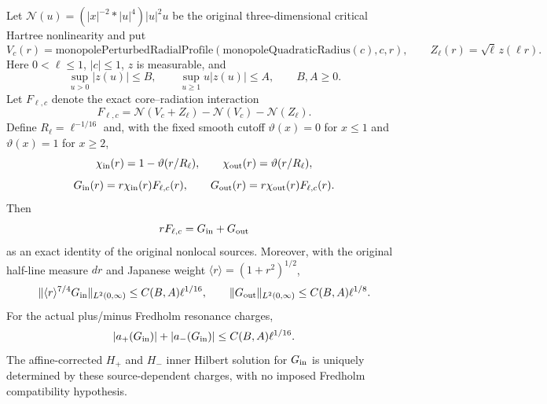%

\begin{lemma}
\label{lem:hbl-physical-two-weight-source}
Let $\mathcal{N}(u)=(|x|^{-2}*|u|^4)|u|^2u$ be the original
three-dimensional critical Hartree nonlinearity and put
\[
  V_c(r)=\mathrm{monopolePerturbedRadialProfile}
       (\mathrm{monopoleQuadraticRadius}(c),c,r),
  \qquad Z_\ell(r)=\sqrt{\ell}\,z(\ell r).
\]
Here $0<\ell\le1$, $|c|\le1$, $z$ is measurable, and
\[
 \sup_{u>0}|z(u)|\le B,\qquad
 \sup_{u\ge1}u|z(u)|\le A,\qquad B,A\ge0.
\]
Let $F_{\ell,c}$ denote the exact core--radiation interaction
\[
 F_{\ell,c}=\mathcal{N}(V_c+Z_\ell)
          -\mathcal{N}(V_c)-\mathcal{N}(Z_\ell).
\]
Define $R_\ell=\ell^{-1/16}$ and, with the fixed smooth cutoff
$\vartheta(x)=0$ for $x\le1$ and $\vartheta(x)=1$ for $x\ge2$,
\[
 \chi_{\rm in}(r)=1-\vartheta(r/R_\ell),\qquad
 \chi_{\rm out}(r)=\vartheta(r/R_\ell),
\]
\[
 G_{\rm in}(r)=r\chi_{\rm in}(r)F_{\ell,c}(r),\qquad
 G_{\rm out}(r)=r\chi_{\rm out}(r)F_{\ell,c}(r).
\]
Then
\[
             rF_{\ell,c}=G_{\rm in}+G_{\rm out}
\]
as an exact identity of the original nonlocal sources. Moreover,
with the original half-line measure $dr$ and Japanese weight
$\langle r\rangle=(1+r^2)^{1/2}$,
\[
 \|\langle r\rangle^{7/4}G_{\rm in}\|_{L^2(0,\infty)}
 \le C(B,A)\ell^{1/16},
 \qquad
 \|G_{\rm out}\|_{L^2(0,\infty)}
 \le C(B,A)\ell^{1/8}.
\]
For the actual plus/minus Fredholm resonance charges,
\[
 |a_+(G_{\rm in})|+|a_-(G_{\rm in})|
 \le C(B,A)\ell^{1/16}.
\]
The affine-corrected $H_+$ and $H_-$ inner Hilbert solution for
$G_{\rm in}$ is uniquely determined by these source-dependent
charges, with no imposed Fredholm compatibility hypothesis.
\end{lemma}

